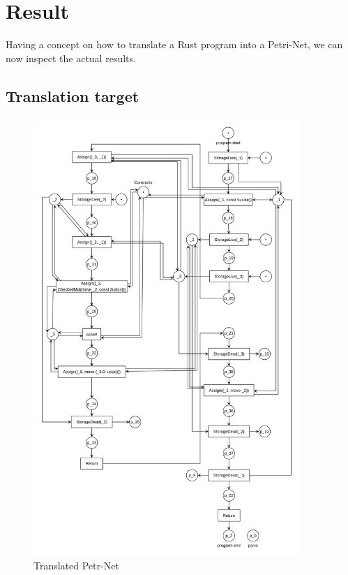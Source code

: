 \chapter{Result}
\label{results}
Having a concept on how to translate a Rust program into a Petri-Net, we can now inspect the actual results.
\section{Translation target}
\begin{figure}
  \centering
  \includegraphics[width=0.9\textwidth]{../diagrams/FunctionCallNet.png}
  \caption{Translated Petr-Net}
  \label{function_call_net}
\end{figure}
